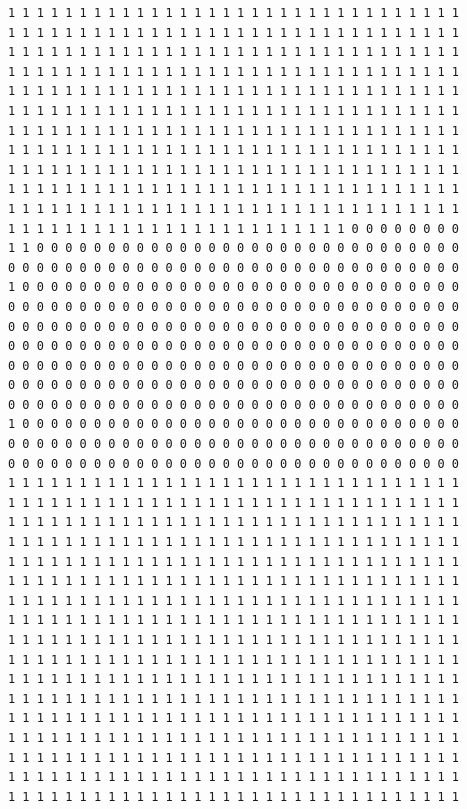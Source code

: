 \documentclass [10 pt, a4 paper]{report}
\begin{document}
\begin{lstlisting}[caption=Output of the simulation once it is finished, label={lst:code1}, frame=single]
1 1 1 1 1 1 1 1 1 1 1 1 1 1 1 1 1 1 1 1 1 1 1 1 1 1 1 1 1 1 1 1
1 1 1 1 1 1 1 1 1 1 1 1 1 1 1 1 1 1 1 1 1 1 1 1 1 1 1 1 1 1 1 1
1 1 1 1 1 1 1 1 1 1 1 1 1 1 1 1 1 1 1 1 1 1 1 1 1 1 1 1 1 1 1 1
1 1 1 1 1 1 1 1 1 1 1 1 1 1 1 1 1 1 1 1 1 1 1 1 1 1 1 1 1 1 1 1
1 1 1 1 1 1 1 1 1 1 1 1 1 1 1 1 1 1 1 1 1 1 1 1 1 1 1 1 1 1 1 1
1 1 1 1 1 1 1 1 1 1 1 1 1 1 1 1 1 1 1 1 1 1 1 1 1 1 1 1 1 1 1 1
1 1 1 1 1 1 1 1 1 1 1 1 1 1 1 1 1 1 1 1 1 1 1 1 1 1 1 1 1 1 1 1
1 1 1 1 1 1 1 1 1 1 1 1 1 1 1 1 1 1 1 1 1 1 1 1 1 1 1 1 1 1 1 1
1 1 1 1 1 1 1 1 1 1 1 1 1 1 1 1 1 1 1 1 1 1 1 1 1 1 1 1 1 1 1 1
1 1 1 1 1 1 1 1 1 1 1 1 1 1 1 1 1 1 1 1 1 1 1 1 1 1 1 1 1 1 1 1
1 1 1 1 1 1 1 1 1 1 1 1 1 1 1 1 1 1 1 1 1 1 1 1 1 1 1 1 1 1 1 1
1 1 1 1 1 1 1 1 1 1 1 1 1 1 1 1 1 1 1 1 1 1 1 1 0 0 0 0 0 0 0 0
1 1 0 0 0 0 0 0 0 0 0 0 0 0 0 0 0 0 0 0 0 0 0 0 0 0 0 0 0 0 0 0
0 0 0 0 0 0 0 0 0 0 0 0 0 0 0 0 0 0 0 0 0 0 0 0 0 0 0 0 0 0 0 0
1 0 0 0 0 0 0 0 0 0 0 0 0 0 0 0 0 0 0 0 0 0 0 0 0 0 0 0 0 0 0 0
0 0 0 0 0 0 0 0 0 0 0 0 0 0 0 0 0 0 0 0 0 0 0 0 0 0 0 0 0 0 0 0
0 0 0 0 0 0 0 0 0 0 0 0 0 0 0 0 0 0 0 0 0 0 0 0 0 0 0 0 0 0 0 0
0 0 0 0 0 0 0 0 0 0 0 0 0 0 0 0 0 0 0 0 0 0 0 0 0 0 0 0 0 0 0 0
0 0 0 0 0 0 0 0 0 0 0 0 0 0 0 0 0 0 0 0 0 0 0 0 0 0 0 0 0 0 0 0
0 0 0 0 0 0 0 0 0 0 0 0 0 0 0 0 0 0 0 0 0 0 0 0 0 0 0 0 0 0 0 0
0 0 0 0 0 0 0 0 0 0 0 0 0 0 0 0 0 0 0 0 0 0 0 0 0 0 0 0 0 0 0 0
1 0 0 0 0 0 0 0 0 0 0 0 0 0 0 0 0 0 0 0 0 0 0 0 0 0 0 0 0 0 0 0
0 0 0 0 0 0 0 0 0 0 0 0 0 0 0 0 0 0 0 0 0 0 0 0 0 0 0 0 0 0 0 0
0 0 0 0 0 0 0 0 0 0 0 0 0 0 0 0 0 0 0 0 0 0 0 0 0 0 0 0 0 0 0 0
1 1 1 1 1 1 1 1 1 1 1 1 1 1 1 1 1 1 1 1 1 1 1 1 1 1 1 1 1 1 1 1
1 1 1 1 1 1 1 1 1 1 1 1 1 1 1 1 1 1 1 1 1 1 1 1 1 1 1 1 1 1 1 1
1 1 1 1 1 1 1 1 1 1 1 1 1 1 1 1 1 1 1 1 1 1 1 1 1 1 1 1 1 1 1 1
1 1 1 1 1 1 1 1 1 1 1 1 1 1 1 1 1 1 1 1 1 1 1 1 1 1 1 1 1 1 1 1
1 1 1 1 1 1 1 1 1 1 1 1 1 1 1 1 1 1 1 1 1 1 1 1 1 1 1 1 1 1 1 1
1 1 1 1 1 1 1 1 1 1 1 1 1 1 1 1 1 1 1 1 1 1 1 1 1 1 1 1 1 1 1 1
1 1 1 1 1 1 1 1 1 1 1 1 1 1 1 1 1 1 1 1 1 1 1 1 1 1 1 1 1 1 1 1
1 1 1 1 1 1 1 1 1 1 1 1 1 1 1 1 1 1 1 1 1 1 1 1 1 1 1 1 1 1 1 1
1 1 1 1 1 1 1 1 1 1 1 1 1 1 1 1 1 1 1 1 1 1 1 1 1 1 1 1 1 1 1 1
1 1 1 1 1 1 1 1 1 1 1 1 1 1 1 1 1 1 1 1 1 1 1 1 1 1 1 1 1 1 1 1
1 1 1 1 1 1 1 1 1 1 1 1 1 1 1 1 1 1 1 1 1 1 1 1 1 1 1 1 1 1 1 1
1 1 1 1 1 1 1 1 1 1 1 1 1 1 1 1 1 1 1 1 1 1 1 1 1 1 1 1 1 1 1 1
1 1 1 1 1 1 1 1 1 1 1 1 1 1 1 1 1 1 1 1 1 1 1 1 1 1 1 1 1 1 1 1
1 1 1 1 1 1 1 1 1 1 1 1 1 1 1 1 1 1 1 1 1 1 1 1 1 1 1 1 1 1 1 1
1 1 1 1 1 1 1 1 1 1 1 1 1 1 1 1 1 1 1 1 1 1 1 1 1 1 1 1 1 1 1 1
1 1 1 1 1 1 1 1 1 1 1 1 1 1 1 1 1 1 1 1 1 1 1 1 1 1 1 1 1 1 1 1
1 1 1 1 1 1 1 1 1 1 1 1 1 1 1 1 1 1 1 1 1 1 1 1 1 1 1 1 1 1 1 1

\end{lstlisting}
\end{document}
